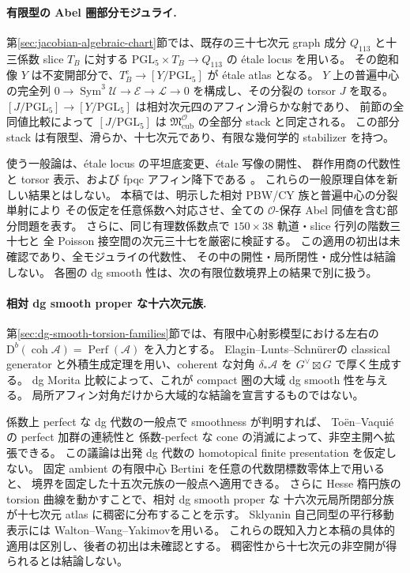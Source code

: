\documentclass[11pt,a4paper]{ltjsarticle}
\numberwithin{equation}{section}
\newcommand{\PGL}{\mathrm{PGL}}
\begin{document}
\paragraph{有限型の Abel 圏部分モジュライ.}
第\ref{sec:jacobian-algebraic-chart}節では、既存の三十七次元 graph 成分
$Q_{113}$ と十三係数 slice $T_B$ に対する
$\PGL_5\times T_B\to Q_{113}$ の étale locus を用いる。
その飽和像 $Y$ は不変開部分で、$T_B^e\to[Y/\PGL_5]$ が étale atlas となる。
$Y$ 上の普遍中心の完全列
$0\to\operatorname{Sym}^3\mathcal U\to\mathcal E\to\mathcal L\to0$
を構成し、その分裂の torsor $J$ を取る。
$[J/\PGL_5]\to[Y/\PGL_5]$ は相対次元四のアフィン滑らかな射であり、
前節の全同値比較によって $[J/\PGL_5]$ は
$\mathfrak M^{\mathcal O}_{\mathrm{cub}}$ の全部分 stack と同定される。
この部分 stack は有限型、滑らか、十七次元であり、有限な幾何学的 stabilizer を持つ。

使う一般論は、étale locus の平坦底変更、étale 写像の開性、
群作用商の代数性と torsor 表示、および fpqc アフィン降下である
\cite[Lemmas~29.37.13,29.37.15,29.37.17,35.37.1,
Section~95.15, Theorems~97.17.2,101.21.6]{StacksAlgebraicChart}。
これらの一般原理自体を新しい結果とはしない。
本稿では、明示した相対 PBW/CY 族と普遍中心の分裂単射により
その仮定を任意係数へ対応させ、全ての $\mathcal O$-保存 Abel 同値を含む部分問題を表す。
さらに、同じ有理数係数点で $150\times38$ 軌道・slice 行列の階数三十七と
全 Poisson 接空間の次元三十七を厳密に検証する。
この適用の初出は未確認であり、全モジュライの代数性、
その中の開性・局所閉性・成分性は結論しない。
各圏の dg smooth 性は、次の有限位数境界上の結果で別に扱う。


\paragraph{相対 dg smooth proper な十六次元族.}
第\ref{sec:dg-smooth-torsion-families}節では、有限中心射影模型における左右の
$\mathrm D^b(\operatorname{coh}\mathscr A)=\operatorname{Perf}(\mathscr A)$ を入力とする。
Elagin--Lunts--Schn\"urer\cite[Theorems~4.15,4.18]{ELSSmoothAlgebras}の
classical generator と外積生成定理を用い、coherent な対角
$\delta_*\mathscr A$ を $G^\vee\boxtimes G$ で厚く生成する。
dg Morita 比較によって、これが compact 圏の大域 dg smooth 性を与える。
局所アフィン対角だけから大域的な結論を宣言するものではない。

係数上 perfect な dg 代数の一般点で smoothness が判明すれば、
To\"en--Vaqui\'e\cite[Lemma~2.10]{ToenVaquieObjects}の perfect 加群の連続性と
係数-perfect な cone の消滅によって、非空主開へ拡張できる。
この議論は出発 dg 代数の homotopical finite presentation を仮定しない。
固定 ambient の有限中心 Bertini を任意の代数閉標数零体上で用いると、
境界を固定した十五次元族の一般点へ適用できる。
さらに Hesse 楕円族の torsion 曲線を動かすことで、相対 dg smooth proper な
十六次元局所閉部分族が十七次元 atlas に稠密に分布することを示す。
Sklyanin 自己同型の平行移動表示には
Walton--Wang--Yakimov\cite[Definition--Lemma~2.13]{WWYSklyaninPoisson}を用いる。
これらの既知入力と本稿の具体的適用は区別し、後者の初出は未確認とする。
稠密性から十七次元の非空開が得られるとは結論しない。
\end{document}

